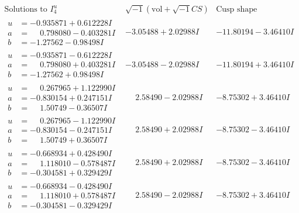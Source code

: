 \documentclass[1p]{elsarticle_modified}
\theoremstyle{definition}
\newcommand{\I}{\sqrt{-1}}
\begin{document}
$$\begin{array}{c|c|c}  
\text{Solutions to }I^u_{4}& \I (\text{vol} + \sqrt{-1}CS) & \text{Cusp shape}\\
 \hline 
\begin{aligned}
u &= -0.935871 + 0.612228 I \\
a &= \phantom{-}0.798080 - 0.403281 I \\
b &= -1.27562 - 0.98498 I\end{aligned}
 & -3.05488 + 2.02988 I & -11.80194 - 3.46410 I \\ \hline\begin{aligned}
u &= -0.935871 - 0.612228 I \\
a &= \phantom{-}0.798080 + 0.403281 I \\
b &= -1.27562 + 0.98498 I\end{aligned}
 & -3.05488 - 2.02988 I & -11.80194 + 3.46410 I \\ \hline\begin{aligned}
u &= \phantom{-}0.267965 + 1.122990 I \\
a &= -0.830154 + 0.247151 I \\
b &= \phantom{-}1.50749 - 0.36507 I\end{aligned}
 & \phantom{-}2.58490 - 2.02988 I & -8.75302 + 3.46410 I \\ \hline\begin{aligned}
u &= \phantom{-}0.267965 - 1.122990 I \\
a &= -0.830154 - 0.247151 I \\
b &= \phantom{-}1.50749 + 0.36507 I\end{aligned}
 & \phantom{-}2.58490 + 2.02988 I & -8.75302 - 3.46410 I \\ \hline\begin{aligned}
u &= -0.668934 + 0.428490 I \\
a &= \phantom{-}1.118010 - 0.578487 I \\
b &= -0.304581 + 0.329429 I\end{aligned}
 & \phantom{-}2.58490 + 2.02988 I & -8.75302 - 3.46410 I \\ \hline\begin{aligned}
u &= -0.668934 - 0.428490 I \\
a &= \phantom{-}1.118010 + 0.578487 I \\
b &= -0.304581 - 0.329429 I\end{aligned}
 & \phantom{-}2.58490 - 2.02988 I & -8.75302 + 3.46410 I \\ \hline\begin{aligned}

\end{aligned}
\end{array}$$
\end{document}
